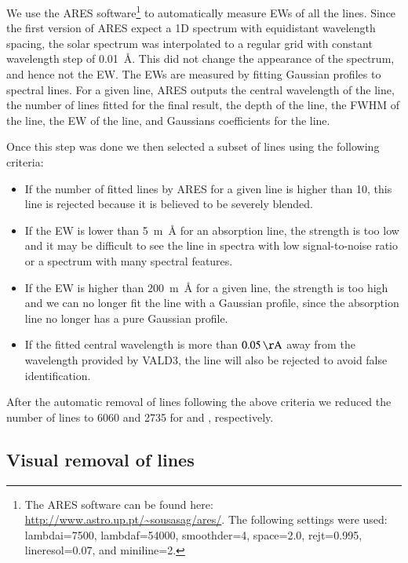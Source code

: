 \documentclass{aa}
\begin{document}
We use the ARES software\footnote{The ARES software can be found here:
\url{http://www.astro.up.pt/~sousasag/ares/}. The following settings
were used: lambdai=7500, lambdaf=54000, smoothder=4, space=2.0,
rejt=0.995, lineresol=0.07, and miniline=2.}\citep{Sousa2007,Sousa2015a}
to automatically measure EWs of all the lines. Since the first version
of ARES expect a 1D spectrum with equidistant wavelength spacing,
the solar spectrum was interpolated to a regular grid with constant
wavelength step of \SI{0.01}{\angstrom}. This did not change the
appearance of the spectrum, and hence not the EW. The EWs are measured
by fitting Gaussian profiles to spectral lines. For a given line, ARES
outputs the central wavelength of the line, the number of lines fitted
for the final result, the depth of the line, the FWHM of the line, the EW
of the line, and Gaussians coefficients for the line.

Once this step was done we then selected a subset of lines using the
following criteria:
\begin{itemize}
    \item If the number of fitted lines by ARES for a given line is higher than 10,
        this line is rejected because it is believed to be severely blended.
    \item If the EW is lower than \SI{5}{m\angstrom} for an absorption line, the strength
        is too low and it may be difficult to see the line in spectra with low
        signal-to-noise ratio or a spectrum with many spectral features.
    \item If the EW is higher than \SI{200}{m\angstrom} for a given line, the strength
        is too high and we can no longer fit the line with a Gaussian profile, since
        the absorption line no longer has a pure Gaussian profile.
    \item If the fitted central wavelength is more than $\SI{0.05}{\AA}$ away
        from the wavelength provided by VALD3, the line will also be rejected to
        avoid false identification.
\end{itemize}
After the automatic removal of lines following the above criteria
we reduced the number of lines to 6060 and 2735 for  and
, respectively.



\subsection{Visual removal of lines}
\label{sub:visual_removal_of_lines}
\end{document}
